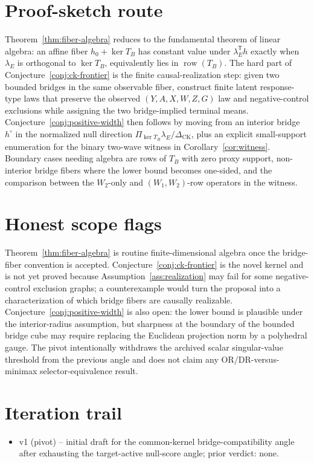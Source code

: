 \documentclass[11pt]{article}
\newcommand{\transpose}{\mathsf{T}}
\theoremstyle{definition}
\theoremstyle{plain}
\theoremstyle{remark}
\begin{document}
\section{Proof-sketch route}
Theorem~\ref{thm:fiber-algebra} reduces to the fundamental theorem of linear
algebra: an affine fiber \(h_0+\ker T_B\) has constant value under
\(\lambda_E^\transpose h\) exactly when \(\lambda_E\) is orthogonal to
\(\ker T_B\), equivalently lies in \(\operatorname{row}(T_B)\).  The hard part
of Conjecture~\ref{conj:ck-frontier} is the finite causal-realization step:
given two bounded bridges in the same observable fiber, construct finite
latent response-type laws that preserve the observed \((Y,A,X,W,Z,G)\) law and
negative-control exclusions while assigning the two bridge-implied terminal
means.  Conjecture~\ref{conj:positive-width} then follows by moving from an
interior bridge \(h^\circ\) in the normalized null direction
\(\Pi_{\ker T_B}\lambda_E/\Delta_{\mathrm{CK}}\), plus an explicit
small-support enumeration for the binary two-wave witness in
Corollary~\ref{cor:witness}.  Boundary cases needing algebra are rows of
\(T_B\) with zero proxy support, non-interior bridge fibers where the lower
bound becomes one-sided, and the comparison between the \(W_2\)-only and
\((W_1,W_2)\)-row operators in the witness.

\section{Honest scope flags}
Theorem~\ref{thm:fiber-algebra} is routine finite-dimensional algebra once the
bridge-fiber convention is accepted.  Conjecture~\ref{conj:ck-frontier} is the
novel kernel and is not yet proved because Assumption~\ref{ass:realization}
may fail for some negative-control exclusion graphs; a counterexample would
turn the proposal into a characterization of which bridge fibers are causally
realizable.  Conjecture~\ref{conj:positive-width} is also open: the lower
bound is plausible under the interior-radius assumption, but sharpness at the
boundary of the bounded bridge cube may require replacing the Euclidean
projection norm by a polyhedral gauge.  The pivot intentionally withdraws the
archived scalar singular-value threshold from the previous angle and does not
claim any OR/DR-versus-minimax selector-equivalence result.

\section{Iteration trail}
\begin{itemize}[leftmargin=*]
\item v1 (pivot) -- initial draft for the common-kernel bridge-compatibility
angle after exhausting the target-active null-score angle; prior verdict:
none.
\end{itemize}
\end{document}
